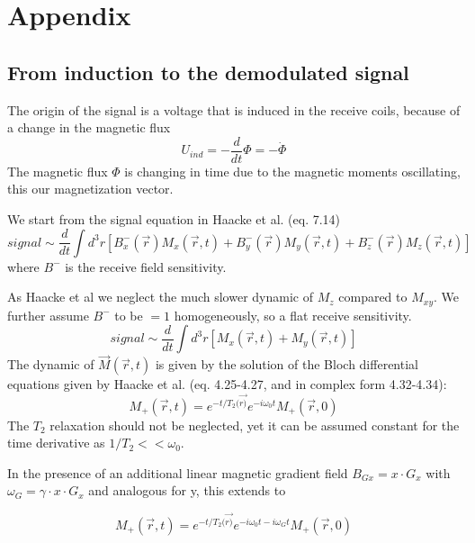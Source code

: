 \documentclass[a4paper,12pt]{extarticle}
\begin{document}
\newpage
\section{Appendix}
\vspace{7.5cm}
\subsection{From induction to the demodulated signal} \label{subsec:app_induction}
 The origin of the signal is a voltage that is induced in the receive coils, because of a change in the magnetic flux
 \begin{equation}
 U_{ind}=-\frac{d}{dt}\Phi=-\dot\Phi
 \end{equation}
 The magnetic flux $\Phi$ is changing in time due to the magnetic moments oscillating, this our magnetization vector.
 
 We start from the signal equation in Haacke et al. (eq. 7.14)
\begin{equation}
signal\sim\frac{d}{dt}\int d^{3}r[B_{x}^{-}(\vec{r})M_{x}(\vec{r},t)+B_{y}^{-}(\vec{r})M_{y}(\vec{r},t)+B_{z}^{-}(\vec{r})M_{z}(\vec{r},t)]
\end{equation}
where $B^{-}$ is the receive field sensitivity.

As Haacke et al we neglect the much slower dynamic of $M_{z}$ compared to $M_{xy}$. We further assume $B^{-}$ to be $= 1$ homogeneously, so a flat receive sensitivity.
\begin{equation}
signal\sim\frac{d}{dt}\int d^{3}r[M_{x}(\vec{r},t)+M_{y}(\vec{r},t)]
\end{equation}
The dynamic of $\vec{M}(\vec{r},t)$ is given by the solution of the Bloch differential equations given by Haacke et al. (eq. 4.25-4.27, and in complex form 4.32-4.34):
\begin{equation}
M_{+}(\vec{r},t)=e^{-t/T_{2}(\vec{r)}}e^{-i\omega_{0}t}M_{+}(\vec{r},0)
\end{equation}
The $T_{2}$ relaxation should not be neglected, yet it can be assumed constant for the time derivative as $1/T_{2}<<\omega_{0}$.

In the presence of an additional linear magnetic gradient field $B_{Gx}=x\cdot G_{x}$ with $\omega_{G}=\gamma\cdot x\cdot G_{x}$ and analogous for y, this extends to

\begin{equation}
M_{+}(\vec{r},t)=e^{-t/T_{2}(\vec{r)}}e^{-i\omega_{0}t-i\omega_{G}t}M_{+}(\vec{r},0)
\end{equation}
\end{document}
